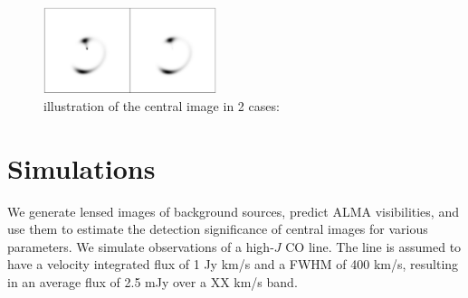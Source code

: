 \documentclass[chicago]{emulateapj}
\begin{document}

\begin{figure}
\begin{center}
\centering
\includegraphics[trim= 0 0 0 0, width=0.45\textwidth]{figures/f_02.eps}
\centering
\end{center}
\caption{ illustration of the central image in 2 cases: 
\label{fig1}}
\end{figure}


\section{Simulations}
We generate lensed images of background sources, predict ALMA visibilities, and use them to estimate the detection significance of central images for various parameters. We simulate observations of a high-$J$ CO line. The line is assumed to have a velocity integrated flux of 1 Jy km/s and a FWHM of 400 km/s, resulting in an average flux of 2.5 mJy over a XX km/s band. 
\end{document}
